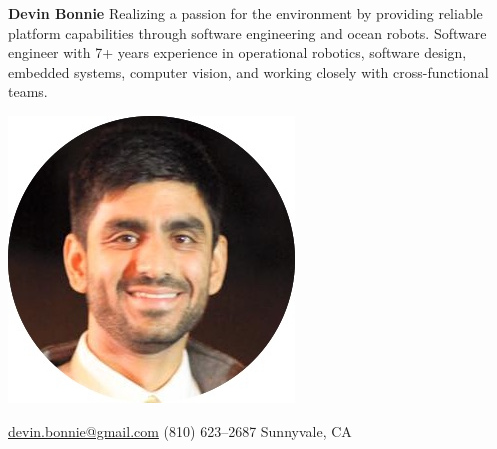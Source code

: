\documentclass{article}
\begin{document}
\renewcommand{\labelitemi}{\tiny$\bullet$}
{
\hspace{-12px}
\begin{minipage}[t]{0.33\textwidth}
\begin{flushleft}
\noindent
\hspace{-15px} \textbf{\fontsize{22}{0}\selectfont Devin Bonnie}
\vspace{7px}
\linebreak
\noindent
\small{Realizing a passion for the environment by providing reliable platform capabilities through software engineering and ocean robots. Software engineer with 7+ years experience in operational robotics, software design, embedded systems, computer vision, and working closely with cross-functional teams.}
\vspace*{1\baselineskip}
\end{flushleft}
\end{minipage}
\begin{minipage}[c]{0.33\textwidth}
\begin{center}
\includegraphics[trim= 0cm 8cm 0 0cm,scale=0.33]{dbCircle}
\end{center}
\end{minipage}
\begin{minipage}[t]{0.33\textwidth}
\begin{flushright}
\vspace*{1.5\baselineskip}
\href{mailto:devin.bonnie@gmail.com}{devin.bonnie@gmail.com}  \space\space \Letter
 \vspace{1px}
\linebreak
(810) 623--2687 \space\space \Telefon
 \vspace{1px}
\linebreak
Sunnyvale, CA \space\space \Mundus

\end{flushright}
\end{minipage}}
\end{document}

